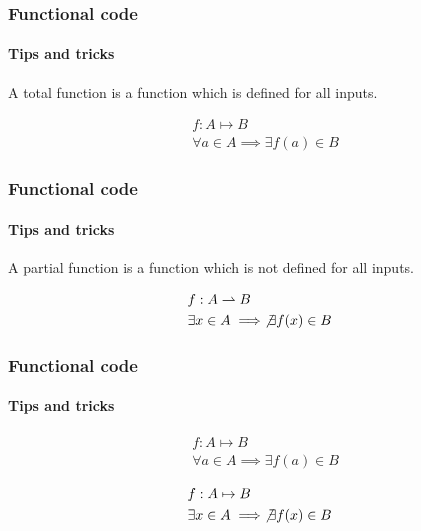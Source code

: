 \begin{frame}
    \frametitle{Functional code}
    \framesubtitle{Tips and tricks}

    A total function is a function which is defined for all inputs.

    \pause

    \begin{definition}
        \begin{align*}
        & f: A \mapsto B\\
        & \forall a \in A \implies \exists f(a) \in B
        \end{align*}
    \end{definition}
\end{frame}

\begin{frame}
    \frametitle{Functional code}
    \framesubtitle{Tips and tricks}

    A partial function is a function which is not defined for all inputs.

    \pause

    \begin{definition}
        \begin{align*}
        & f: A \rightharpoonup B\\
        & \exists x \in A \implies \not\exists f(x) \in B
        \end{align*}
    \end{definition}
\end{frame}

\begin{frame}
    \frametitle{Functional code}
    \framesubtitle{Tips and tricks}

    \begin{definition}
        \begin{align*}
        & f: A \mapsto B\\
        & \forall a \in A \implies \exists f(a) \in B
        \end{align*}
    \end{definition}

    \begin{definition}
        \begin{align*}
        & f: A \mapsto B\\
        & \exists x \in A \implies \not\exists f(x) \in B
        \end{align*}
    \end{definition}
\end{frame}

